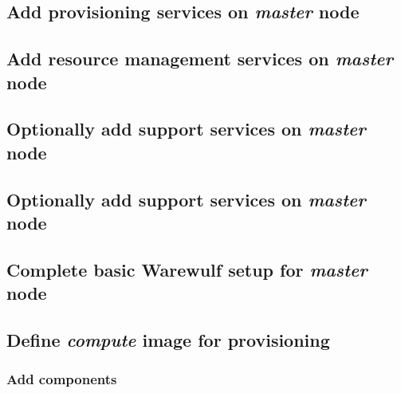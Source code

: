 \documentclass[letterpaper]{article}
\begin{document}
\subsection{Add provisioning services on {\em master} node} \label{sec:add_provisioning}




\vspace*{0.15cm}
\subsection{Add resource management services on {\em master} node} \label{sec:add_rm}


\subsection{Optionally add \InfiniBand{} support services on {\em master} node} \label{sec:add_ofed}


\subsection{Optionally add \OmniPath{} support services on {\em master} node} \label{sec:add_opa}


\vspace*{-0.15cm}
\subsection{Complete basic Warewulf setup for {\em master} node} \label{sec:setup_ww}



\subsection{Define {\em compute} image for provisioning}


\subsubsection{Add \OHPC{} components} \label{sec:add_components}



\vspace*{.2cm}
\end{document}
